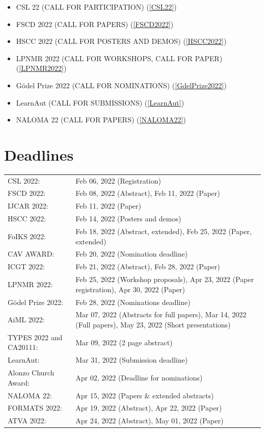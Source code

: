 \documentclass[prodmode,acmtecs]{acmsmall} %
\begin{document}
\begin{itemize}
\begin{itemize}\item CSL 22 (CALL FOR PARTICIPATION) (\cref{CSL22})
\item FSCD 2022 (CALL FOR PAPERS) (\cref{FSCD2022})
\item HSCC 2022 (CALL FOR POSTERS AND DEMOS) (\cref{HSCC2022})
\item LPNMR 2022 (CALL FOR WORKSHOPS, CALL FOR PAPER) (\cref{LPNMR2022})
\item Gödel Prize 2022 (CALL FOR NOMINATIONS) (\cref{GdelPrize2022})
\item LearnAut (CALL FOR SUBMISSIONS) (\cref{LearnAut})
\item NALOMA 22 (CALL FOR PAPERS) (\cref{NALOMA22})
\end{itemize} 
\end{itemize}\section{Deadlines}\label{deadlines}\begin{tabulary}{\linewidth}{LL}CSL 2022:  & Feb 06, 2022 (Registration) \\
FSCD 2022:  & Feb 08, 2022 (Abstract), Feb 11, 2022 (Paper) \\
IJCAR 2022:  & Feb 11, 2022 (Paper) \\
HSCC 2022:  & Feb 14, 2022 (Posters and demos) \\
FoIKS 2022:  & Feb 18, 2022 (Abstract, extended), Feb 25, 2022 (Paper, extended) \\
CAV AWARD:  & Feb 20, 2022 (Nomination deadline) \\
ICGT 2022:  & Feb 21, 2022 (Abstract), Feb 28, 2022 (Paper) \\
LPNMR 2022:  & Feb 25, 2022 (Workshop proposals), Apr 23, 2022 (Paper registration), Apr 30, 2022 (Paper) \\
Gödel Prize 2022:  & Feb 28, 2022 (Nominations deadline) \\
AiML 2022:  & Mar 07, 2022 (Abstracts for full papers), Mar 14, 2022 (Full papers), May 23, 2022 (Short presentations) \\
TYPES 2022 and CA20111:  & Mar 09, 2022 (2 page abstract) \\
LearnAut:  & Mar 31, 2022 (Submission deadline) \\
Alonzo Church Award:  & Apr 02, 2022 (Deadline for nominations) \\
NALOMA 22:  & Apr 15, 2022 (Papers \& extended abstracts) \\
FORMATS 2022:  & Apr 19, 2022 (Abstract), Apr 22, 2022 (Paper) \\
ATVA 2022:  & Apr 24, 2022 (Abstract), May 01, 2022 (Paper) \\
\end{tabulary}
\end{document}

